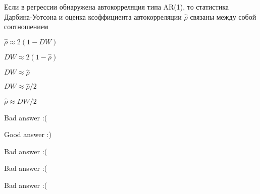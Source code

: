 
\begin{question}
Если в регрессии обнаружена автокорреляция типа AR(1), то статистика Дарбина-Уотсона и оценка коэффициента автокорреляции \(\hat\rho\) связаны между собой соотношением
\begin{answerlist}
  \item \(\hat\rho \approx 2(1-DW)\)
  \item \(DW \approx 2(1-\hat\rho)\)
  \item \(DW \approx \hat\rho\)
  \item \(DW \approx \hat\rho / 2\)
  \item \(\hat\rho \approx DW/2\)
\end{answerlist}
\end{question}

\begin{solution}
\begin{answerlist}
  \item Bad answer :(
  \item Good answer :)
  \item Bad answer :(
  \item Bad answer :(
  \item Bad answer :(
\end{answerlist}
\end{solution}


